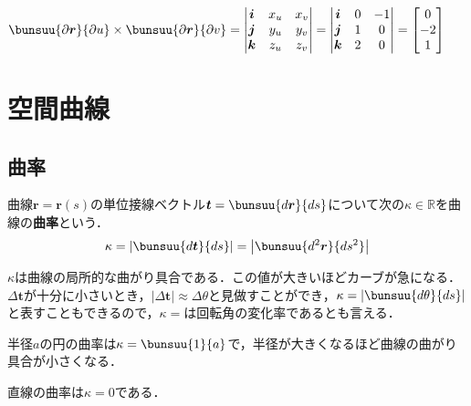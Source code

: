 \begin{enumerate}[leftmargin=18pt, labelsep=10pt, labelsep=10pt, itemindent=9pt]
\begin{enumerate}[label=\textbf{[\arabic*]}, labelsep=10pt, leftmargin=23pt, itemsep=12pt]
				$\bunsuu{\partial \bm{r}}{\partial u} \times \bunsuu{\partial \bm{r}}{\partial v} =
				\begin{vmatrix}
					\bm{i} & x_u & x_v\\
					\bm{j} & y_u & y_v\\
					\bm{k} & z_u & z_v
				\end{vmatrix}
				=
				\begin{vmatrix}
					\bm{i} & 0 & -1\\
					\bm{j} & 1 & 0\\
					\bm{k} & 2 & 0
				\end{vmatrix}
				=
				\begin{bmatrix}
					0\\ -2\\ 1
				\end{bmatrix}
				$
		\end{enumerate}
\end{enumerate}



\section{空間曲線}
\subsection{曲率}

曲線$\bm{r} = \bm{r}(s)$の単位接線ベクトル$\bm{t} = \bunsuu{d\bm{r}}{ds}$について次の$\kappa \in \mathbb{R}$を曲線の\textbf{曲率}という．
\begin{equation}
	\kappa = \left|\bunsuu{d\bm{t}}{ds}\right| = \left|\bunsuu{d^2\bm{r}}{ds^2}\right|
\end{equation}

$\kappa$は曲線の局所的な曲がり具合である．この値が大きいほどカーブが急になる．$\varDelta \bm{t}$が十分に小さいとき，$|\varDelta \bm{t}| \approx \varDelta \theta$と見做すことができ，$\kappa = \left|\bunsuu{d\theta}{ds}\right|$と表すこともできるので，$\kappa = $は回転角の変化率であるとも言える．

\begin{enumerate}[label=\textbf{[\arabic*]}, labelsep=10pt, leftmargin=23pt]
	\item 半径$a$の円の曲率は$\kappa = \bunsuu{1}{a}$で，半径が大きくなるほど曲線の曲がり具合が小さくなる．
	\item 直線の曲率は$\kappa = 0$である．
\end{enumerate}

